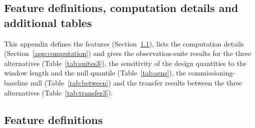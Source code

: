 \begin{appendices}

\section{Feature definitions, computation details and additional tables}\label{app:appendix}






This appendix defines the features (Section~\ref{app:features}), lists the computation details (Section~\ref{app:computation}) and gives the observation-suite results for the three alternatives (Table~\ref{tab:suites3}), the sensitivity of the design quantities to the window length and the null quantile (Table~\ref{tab:sens}), the commissioning-baseline null (Table~\ref{tab:between}) and the transfer results between the three alternatives (Table~\ref{tab:transfer3}).

\subsection{Feature definitions}\label{app:features}


\end{appendices}
